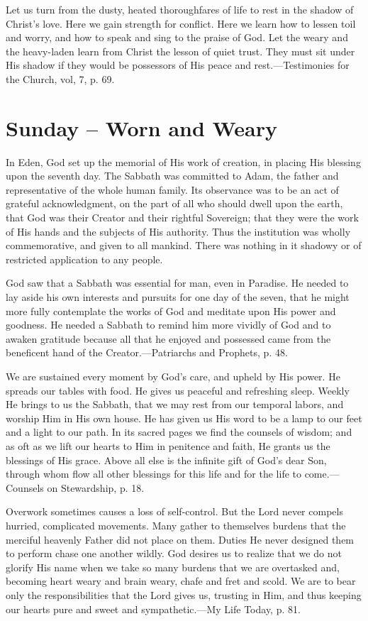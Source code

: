 \documentclass[a4paper, 10pt, twoside, headings=small]{scrartcl}
\begin{document}
\begin{multicols}{2}
Let us turn from the dusty, heated thoroughfares of life to rest in the shadow of Christ’s love. Here we gain strength for conflict. Here we learn how to lessen toil and worry, and how to speak and sing to the praise of God. Let the weary and the heavy-laden learn from Christ the lesson of quiet trust. They must sit under His shadow if they would be possessors of His peace and rest.—Testimonies for the Church, vol, 7, p. 69.

\section*{Sunday – Worn and Weary}

In Eden, God set up the memorial of His work of creation, in placing His blessing upon the seventh day. The Sabbath was committed to Adam, the father and representative of the whole human family. Its observance was to be an act of grateful acknowledgment, on the part of all who should dwell upon the earth, that God was their Creator and their rightful Sovereign; that they were the work of His hands and the subjects of His authority. Thus the institution was wholly commemorative, and given to all mankind. There was nothing in it shadowy or of restricted application to any people.

God saw that a Sabbath was essential for man, even in Paradise. He needed to lay aside his own interests and pursuits for one day of the seven, that he might more fully contemplate the works of God and meditate upon His power and goodness. He needed a Sabbath to remind him more vividly of God and to awaken gratitude because all that he enjoyed and possessed came from the beneficent hand of the Creator.—Patriarchs and Prophets, p. 48.

We are sustained every moment by God’s care, and upheld by His power. He spreads our tables with food. He gives us peaceful and refreshing sleep. Weekly He brings to us the Sabbath, that we may rest from our temporal labors, and worship Him in His own house. He has given us His word to be a lamp to our feet and a light to our path. In its sacred pages we find the counsels of wisdom; and as oft as we lift our hearts to Him in penitence and faith, He grants us the blessings of His grace. Above all else is the infinite gift of God’s dear Son, through whom flow all other blessings for this life and for the life to come.—Counsels on Stewardship, p. 18.

Overwork sometimes causes a loss of self-control. But the Lord never compels hurried, complicated movements. Many gather to themselves burdens that the merciful heavenly Father did not place on them. Duties He never designed them to perform chase one another wildly. God desires us to realize that we do not glorify His name when we take so many burdens that we are overtasked and, becoming heart weary and brain weary, chafe and fret and scold. We are to bear only the responsibilities that the Lord gives us, trusting in Him, and thus keeping our hearts pure and sweet and sympathetic.—My Life Today, p. 81.


\end{multicols}
\end{document}
